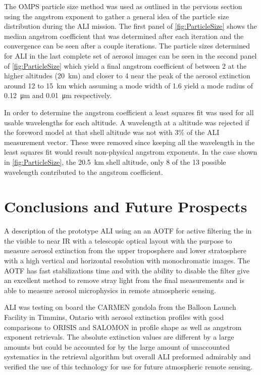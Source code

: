 \documentclass[12pt]{article}
\begin{document}
The OMPS particle size method was used as outlined in the pervious section using the angstrom exponent to gather a general idea of the particle size distribution during the ALI mission. The first panel of \autoref{fig:ParticleSize} shows the median angstrom coefficient that was determined after each iteration and the convergence can be seen after a couple iterations. The particle sizes determined for ALI in the last complete set of aerosol images can be seen in the second panel of \autoref{fig:ParticleSize} which yield a final angstrom coefficient of between 2 at the higher altitudes (20~km) and closer to 4 near the peak of the aerosol extinction around 12 to 15~km which assuming a mode width of 1.6 yield a mode radius of 0.12~\si{\micro\metre} and 0.01~\si{\micro\metre} respectively.

In order to determine the angstrom coefficient a least squares fit was used for all usable wavelengths for each altitude. A wavelength at a altitude was rejected if the foreword model at that shell altitude was not with 3\% of the ALI measurement vector. These were removed since keeping all the wavelength in the least squares fit would result non-physical angstrom exponents. In the case shown in \autoref{fig:ParticleSize}, the 20.5~km shell altitude, only 8 of the 13 possible wavelength contributed to the angstrom coefficient.

\section{Conclusions and Future Prospects}

A description of the prototype ALI using an an AOTF for active filtering the in the visible to near IR with a telescopic optical layout with the purpose to measure aerosol extinction from the upper troposphere and lower stratosphere with a high vertical and horizontal resolution with monochromatic images. The AOTF has fast stabilizations time and with the ability to disable the filter give an excellent method to remove stray light from the final measurements and is able to measure aerosol microphysics in remote atmospheric sensing.

ALI was testing on board the CARMEN gondola from the Balloon Launch Facility in Timmins, Ontario with aerosol extinction profiles with good comparisons to ORISIS and SALOMON in profile shape as well as angstrom exponent retrievals. The absolute extinction values are different by a large amounts but could be accounted for by the large amount of unaccounted systematics in the retrieval algorithm but overall ALI preformed admirably and verified the use of this technology for use for future atmospheric remote sensing.
\end{document}

